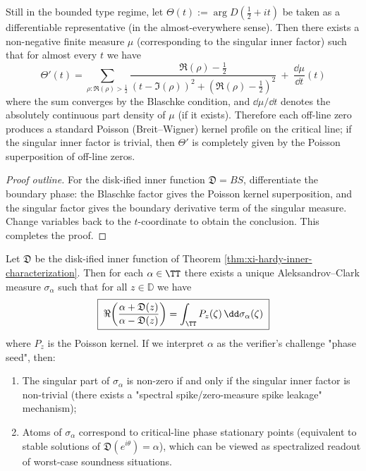 \begin{proposition}\label{prop:xi-phase-derivative-poisson-superposition}
Still in the bounded type regime, let \(\Theta(t):=\arg D(\tfrac12+it)\) be taken as a differentiable representative (in the almost-everywhere sense).
Then there exists a non-negative finite measure \(\mu\) (corresponding to the singular inner factor) such that for almost every \(t\) we have
\[
\boxed{\;
\Theta'(t)=
\sum_{\rho:\Re(\rho)>\frac12}
\frac{\Re(\rho)-\frac12}{(t-\Im(\rho))^2+(\Re(\rho)-\frac12)^2}
\ +\ \frac{\dd\mu}{\dd t}(t)\;}
\]
where the sum converges by the Blaschke condition, and \(\dd\mu/\dd t\) denotes the absolutely continuous part density of \(\mu\) (if it exists).
Therefore each off-line zero produces a standard Poisson (Breit--Wigner) kernel profile on the critical line; if the singular inner factor is trivial, then \(\Theta'\) is completely given by the Poisson superposition of off-line zeros.
\end{proposition}
\begin{proof}[Proof outline]
For the disk-ified inner function \(\mathfrak{D}=BS\), differentiate the boundary phase: the Blaschke factor gives the Poisson kernel superposition, and the singular factor gives the boundary derivative term of the singular measure.
Change variables back to the \(t\)-coordinate to obtain the conclusion. This completes the proof.
\end{proof}

\begin{corollary}\label{cor:xi-clark-measure-horizon-semantics}
Let \(\mathfrak{D}\) be the disk-ified inner function of Theorem \ref{thm:xi-hardy-inner-characterization}.
Then for each \(\alpha\in\TT\) there exists a unique Aleksandrov--Clark measure \(\sigma_\alpha\) such that for all \(z\in\mathbb{D}\) we have
\[
\boxed{\;
\Re\!\left(\frac{\alpha+\mathfrak{D}(z)}{\alpha-\mathfrak{D}(z)}\right)
=\int_{\TT} P_z(\zeta)\,\dd\sigma_\alpha(\zeta)\;}
\]
where \(P_z\) is the Poisson kernel.
If we interpret \(\alpha\) as the verifier's challenge "phase seed", then:
\begin{enumerate}
  \item The singular part of \(\sigma_\alpha\) is non-zero if and only if the singular inner factor is non-trivial (there exists a "spectral spike/zero-measure spike leakage" mechanism);
  \item Atoms of \(\sigma_\alpha\) correspond to critical-line phase stationary points (equivalent to stable solutions of \(\mathfrak{D}(e^{i\theta})=\alpha\)), which can be viewed as spectralized readout of worst-case soundness situations.
\end{enumerate}
\end{corollary}

